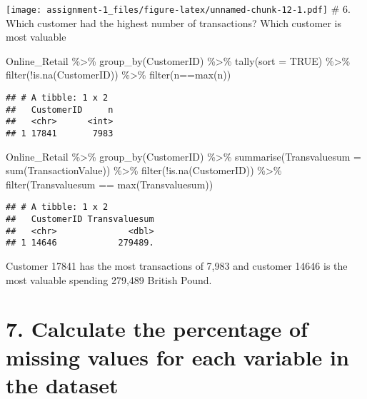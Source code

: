 \documentclass[
]{article}
\newenvironment{Shaded}{\begin{snugshade}}{\end{snugshade}}
\newcommand{\AttributeTok}[1]{\textcolor[rgb]{0.77,0.63,0.00}{#1}}
\newcommand{\ConstantTok}[1]{\textcolor[rgb]{0.00,0.00,0.00}{#1}}
\newcommand{\FunctionTok}[1]{\textcolor[rgb]{0.00,0.00,0.00}{#1}}
\newcommand{\NormalTok}[1]{#1}
\newcommand{\SpecialCharTok}[1]{\textcolor[rgb]{0.00,0.00,0.00}{#1}}
\begin{document}
\texttt{[image: assignment-1\_files/figure-latex/unnamed-chunk-12-1.pdf]}
\# 6. Which customer had the highest number of transactions? Which
customer is most valuable

\begin{Shaded}
\begin{Highlighting}[]
\NormalTok{Online\_Retail }\SpecialCharTok{\%\textgreater{}\%}
  \FunctionTok{group\_by}\NormalTok{(CustomerID) }\SpecialCharTok{\%\textgreater{}\%}
  \FunctionTok{tally}\NormalTok{(}\AttributeTok{sort =} \ConstantTok{TRUE}\NormalTok{) }\SpecialCharTok{\%\textgreater{}\%} 
  \FunctionTok{filter}\NormalTok{(}\SpecialCharTok{!}\FunctionTok{is.na}\NormalTok{(CustomerID)) }\SpecialCharTok{\%\textgreater{}\%} 
  \FunctionTok{filter}\NormalTok{(n}\SpecialCharTok{==}\FunctionTok{max}\NormalTok{(n))}
\end{Highlighting}
\end{Shaded}

\begin{verbatim}
## # A tibble: 1 x 2
##   CustomerID     n
##   <chr>      <int>
## 1 17841       7983
\end{verbatim}

\begin{Shaded}
\begin{Highlighting}[]
\NormalTok{Online\_Retail }\SpecialCharTok{\%\textgreater{}\%}
  \FunctionTok{group\_by}\NormalTok{(CustomerID) }\SpecialCharTok{\%\textgreater{}\%} 
  \FunctionTok{summarise}\NormalTok{(}\AttributeTok{Transvaluesum =} \FunctionTok{sum}\NormalTok{(TransactionValue)) }\SpecialCharTok{\%\textgreater{}\%} 
  \FunctionTok{filter}\NormalTok{(}\SpecialCharTok{!}\FunctionTok{is.na}\NormalTok{(CustomerID)) }\SpecialCharTok{\%\textgreater{}\%} 
  \FunctionTok{filter}\NormalTok{(Transvaluesum }\SpecialCharTok{==} \FunctionTok{max}\NormalTok{(Transvaluesum))}
\end{Highlighting}
\end{Shaded}

\begin{verbatim}
## # A tibble: 1 x 2
##   CustomerID Transvaluesum
##   <chr>              <dbl>
## 1 14646            279489.
\end{verbatim}

Customer 17841 has the most transactions of 7,983 and customer 14646 is
the most valuable spending 279,489 British Pound.

\hypertarget{calculate-the-percentage-of-missing-values-for-each-variable-in-the-dataset}{%
\section{7. Calculate the percentage of missing values for each variable
in the
dataset}\label{calculate-the-percentage-of-missing-values-for-each-variable-in-the-dataset}}
\end{document}
